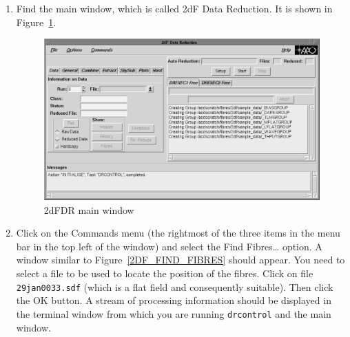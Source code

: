 \documentclass[chapters,twoside,11pt]{starlink}
\begin{document}
\begin{enumerate}
  \item Find the main window, which is called \textsf{2dF Data Reduction}.
   It is shown in Figure~\ref{2DF_DATA_REDUCTION}.

  \begin{figure}[htbp]
     \centering
     \includegraphics[totalheight=3.5in]{sc14_2df_data_reduction}
     \caption{2dFDR main window
     \label{2DF_DATA_REDUCTION} }
  \end{figure}

  \item Click on the \textsf{Commands} menu (the rightmost of the three
   items in the menu bar in the top left of the window) and
   select the \textsf{Find Fibres\ldots} option.  A window similar to
   Figure~\ref{2DF_FIND_FIBRES} should appear.  You need to select a
   file to be used to locate the position of the fibres.  Click on
   file \texttt{29jan0033.sdf} (which is a flat field and consequently
   suitable).  Then click the \textsf{OK} button.  A stream of processing
   information should be displayed in the terminal window from which
   you are running \texttt{drcontrol} and the main window.


\end{enumerate}
\end{document}

